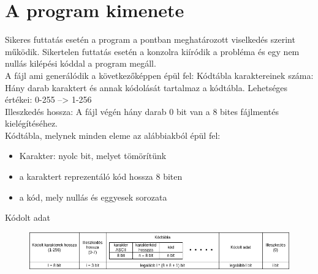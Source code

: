 \documentclass[12pt,a4paper]{report}
\begin{document}
\section{A program kimenete}
Sikeres futtatás esetén a program a  pontban meghatározott viselkedés szerint működik.
Sikertelen futtatás esetén a konzolra kiíródik a probléma és egy nem nullás kilépési kóddal a program megáll. \\
A fájl ami generálódik a következőképpen épül fel:
Kódtábla karaktereinek száma: Hány darab karaktert és annak kódolását tartalmaz a kódtábla. Lehetséges értékei: 0-255 --> 1-256 \\
Illeszkedés hossza: A fájl végén hány darab 0 bit van a 8 bites fájlmentés kielégítéséhez. \\
Kódtábla, melynek minden eleme az alábbiakból épül fel:\\
\begin{itemize}
    \item Karakter: nyolc bit, melyet tömörítünk
    \item a karaktert reprezentáló kód hossza 8 biten
    \item a kód, mely nullás és eggyesek sorozata
\end{itemize}
Kódolt adat

\begin{figure}[H]
    \centerline{\includegraphics[width=\linewidth]{docs/res/encodedfilecontents.png}}
\end{figure}





\end{document}
